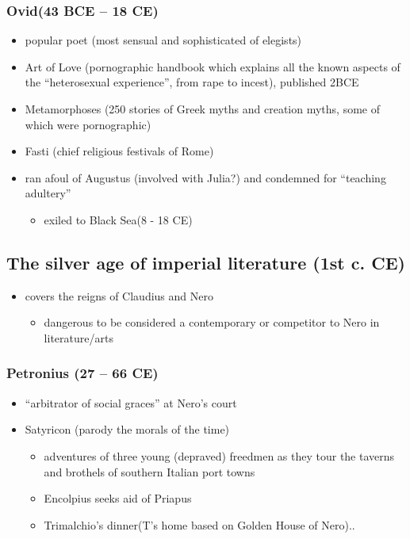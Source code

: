 \documentclass[12pt, twoside]{article}
\begin{document}
\subsubsection{Ovid(43 BCE – 18 CE)}
\begin{itemize}
\item popular poet (most sensual and sophisticated of elegists)
\item Art of Love (pornographic handbook which explains all the known aspects of the “heterosexual experience”, from rape to incest),	published 2BCE
\item Metamorphoses (250 stories of Greek myths and creation myths, some of which were pornographic)
\item Fasti (chief religious festivals of Rome)
\item ran afoul of Augustus (involved with Julia?) and condemned for “teaching adultery”
	\begin{itemize}
	\item exiled to Black Sea(8 - 18 CE)
	\end{itemize}
\end{itemize}

\subsection{The silver age of imperial literature (1st c. CE)}
\begin{itemize}
\item covers the reigns of Claudius and Nero
	\begin{itemize}
	\item dangerous to be considered a contemporary or competitor to Nero in literature/arts
	\end{itemize}
\end{itemize}

\subsubsection{Petronius (27 – 66 CE)}
\begin{itemize}
\item “arbitrator of social graces” at Nero’s court
\item Satyricon (parody the morals of the time)
	\begin{itemize}
	\item adventures of three young (depraved) freedmen as they tour the taverns and brothels of southern Italian port towns
	\item Encolpius seeks aid of Priapus
	\item Trimalchio's dinner(T's home based on Golden House of Nero)..
	\end{itemize}
\end{itemize}
\end{document}
